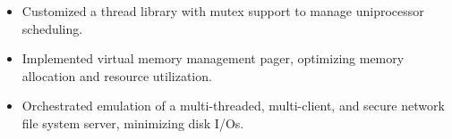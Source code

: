 \documentclass[10pt,a4paper]{altacv}
\begin{document}
\begin{itemize}
	\item Customized a thread library with mutex support to manage uniprocessor scheduling.
	\item Implemented virtual memory management pager, optimizing memory allocation and resource utilization.
	\item Orchestrated emulation of a multi-threaded, multi-client, and secure network file system server, minimizing disk I/Os.
\end{itemize}










\clearpage
%
%
%
%
%
%
%
%
%
%
%
%
%
%
%
%
%
%
%
%
\end{document}
